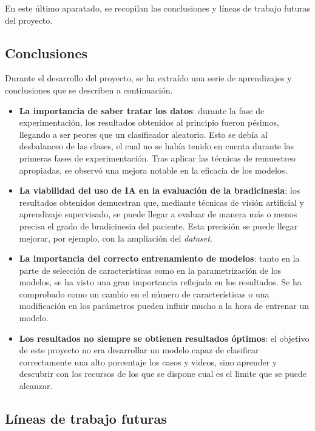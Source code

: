 
En este último aparatado, se recopilan las conclusiones y líneas de trabajo futuras del proyecto.

\subsection{Conclusiones}

Durante el desarrollo del proyecto, se ha extraído una serie de aprendizajes y conclusiones que se describen a continuación. 
\begin{itemize}


\item \textbf{La importancia de saber tratar los datos}: durante la fase de experimentación, los resultados obtenidos al principio fueron pésimos, llegando a ser peores que un clasificador aleatorio. Esto se debía al desbalanceo de las clases, el cual no se había tenido en cuenta durante las primeras fases de experimentación. Tras aplicar las técnicas de remuestreo apropiadas, se observó una mejora notable en la eficacia de los modelos.

\item \textbf{La viabilidad del uso de IA en la evaluación de la bradicinesia}: los resultados obtenidos demuestran que, mediante técnicas de visión artificial y aprendizaje supervisado, se puede llegar a evaluar de manera más o menos precisa el grado de bradicinesia del paciente. Esta precisión se puede llegar mejorar, por ejemplo, con la ampliación del \textit{dataset}.

\item \textbf{La importancia del correcto entrenamiento de modelos}: tanto en la parte de selección de características como en la parametrización de los modelos, se ha visto una gran importancia reflejada en los resultados. Se ha comprobado como un cambio en el número de características o una modificación en los parámetros pueden influir mucho a la hora de entrenar un modelo.

\item \textbf{Los resultados no siempre se obtienen resultados óptimos}: el objetivo de este proyecto no era desarrollar un modelo capaz de clasificar correctamente una alto porcentaje los casos y videos, sino aprender y descubrir con los recursos de los que se dispone cual es el limite que se puede alcanzar. 

\end{itemize}
\subsection{Líneas de trabajo futuras}

